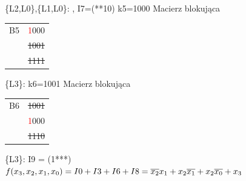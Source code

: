 \documentclass[]{article}
\begin{document}
\{L2,L0\},\{L1,L0\}: , I7=(**10)
\newline
\newline
k5=1000
\newline
Macierz blokująca
\newline
\begin{tabular}[r]{|c|c|}
\hline
    B5 & \textcolor{red}{1}000  \\
      & \sout{1001} \\
      & \sout{1111} \\
 \hline 
\end{tabular}
\newline
\newline
\{L3\}: 
\newline
\newline
k6=1001
\newline
Macierz blokująca
\newline
\begin{tabular}[r]{|c|c|}
\hline
    B6 & \sout{1001}  \\
      & \textcolor{red}{1}000 \\
      & \sout{1110} \\
 \hline 
\end{tabular}
\newline
\newline
\{L3\}: I9 = (1***)
\newline
\newline
$f(x\textsubscript{3},x\textsubscript{2},x\textsubscript{1},x\textsubscript{0})= I0 + I3 + I6 + I8 = \overline{x_{2}}x\textsubscript{1} + x\textsubscript{2}\overline{x_{1}} +x\textsubscript{2}\overline{x_{0}} + x\textsubscript{3}$
\end{document}
